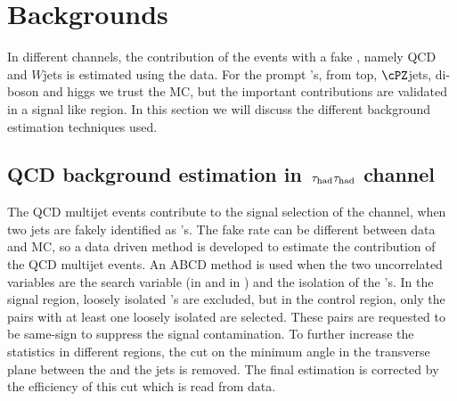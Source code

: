\section{Backgrounds}
\label{sect:bkgLepTau}
In different channels, the contribution of the events with a fake \Tau, namely QCD and $W$jets is estimated using the data. 
For the prompt \Tau's, from top, $\cPZ$jets, di-boson and higgs we trust 
the MC, but the important contributions are validated in a signal like region. 
In this section we will discuss the different background estimation techniques used.

\subsection{\texorpdfstring{QCD background estimation in $\,\tau_{\rm had}\tau_{\rm had}$ channel}{QCD background estimation in tau-tau channel}}
The QCD multijet events contribute to the signal selection of the \tauTau channel, when two jets are 
fakely identified as \Tau's. The fake rate can be different between data and MC, so a data driven method is developed to estimate the 
contribution of the QCD multijet events. 
An ABCD method is used when the two uncorrelated variables are the search variable (\mttwo in \binone and \SumMT in \bintwo) and the 
isolation of the \Tau's. In the signal region, loosely isolated  \Tau's 
are excluded, but in the control region, only the pairs with at least one loosely isolated \Tau are selected. 
These pairs are requested to be same-sign to suppress the signal contamination. To further increase the statistics 
in different regions, the cut on the minimum angle in the transverse plane between the \MET and the jets is removed. The final estimation
is corrected by the efficiency of this cut which is read from data. 

